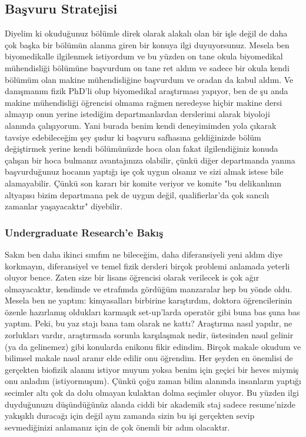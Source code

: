 \documentclass[12pt]{article}
\begin{document}
\subsection{Başvuru Stratejisi}
Diyelim ki okuduğunuz bölümle direk olarak alakalı olan bir işle değil de daha çok başka bir bölümün alanına giren bir konuya ilgi duyuyorsunuz. Mesela ben biyomedikalle ilgilenmek istiyordum ve bu yüzden on tane okula biyomedikal mühendisliği bölümüne başvurdum on tane ret aldım ve sadece bir okula kendi bölümüm olan makine mühendisliğine başvurdum ve oradan da kabul aldım. Ve danışmanım fizik PhD’li olup biyomedikal araştırması yapıyor, ben de şu anda makine mühendisliği öğrencisi olmama rağmen neredeyse hiçbir makine dersi almayıp onun yerine istediğim departmanlardan derslerimi alarak biyoloji alanında çalışıyorum. Yani burada benim kendi deneyimimden yola çıkarak tavsiye edebileceğim şey şudur ki başvuru safhasına geldiğinizde bölüm değiştirmek yerine kendi bölümünüzde hoca olan fakat ilgilendiğiniz konuda çalışan bir hoca bulmanız avantajınıza olabilir, çünkü diğer departmanda yanına başvurduğunuz hocanın yaptığı işe çok uygun olsanız ve sizi almak istese bile alamayabilir. Çünkü son kararı bir komite veriyor ve komite "bu delikanlının altyapısı bizim departmana pek de uygun değil, qualifierlar’da çok sancılı zamanlar yaşayacaktır" diyebilir.

\subsubsection{Undergraduate Research’e Bakış}
Sakın ben daha ikinci sınıfım ne bileceğim, daha diferansiyeli yeni aldım diye korkmayın, diferansiyel ve temel fizik dersleri birçok problemi anlamada yeterli oluyor bence. Zaten size bir lisans öğrencisi olarak verilecek is çok ağır olmayacaktır, kendimde ve etrafımda gördüğüm manzaralar hep bu yönde oldu. Mesela ben ne yaptım: kimyasalları birbirine karıştırdım, doktora öğrencilerinin özenle hazırlamış oldukları karmaşık set-up’larda operatör gibi buna bas şuna bas yaptım. Peki, bu yaz stajı bana tam olarak ne kattı? Araştırma nasıl yapılır, ne zorlukları vardır, araştırmada sorunla karşılaşmak nedir, üstesinden nasıl gelinir (ya da gelinemez) gibi konularda enikonu fikir edindim. Birçok makale okudum ve bilimsel makale nasıl aranır elde edilir onu öğrendim. Her şeyden en önemlisi de gerçekten biofizik alanını istiyor muyum yoksa benim için geçici bir heves miymiş onu anladım (istiyormuşum). Çünkü çoğu zaman bilim alanında insanların yaptığı secimler altı çok da dolu olmayan kulaktan dolma seçimler oluyor. Bu yüzden ilgi duyduğunuzu düşündüğünüz alanda ciddi bir akademik staj sadece resume'nizde yakışıklı duracağı için değil aynı zamanda sizin bu işi gerçekten sevip sevmediğinizi anlamanız için de çok önemli bir adım olacaktır.
\end{document}
